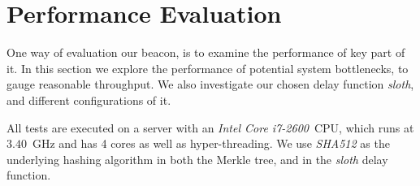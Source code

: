 \section{Performance Evaluation}
One way of evaluation our beacon, is to examine the performance of key part of it.
In this section we explore the performance of potential system bottlenecks, to gauge reasonable throughput.
We also investigate our chosen delay function \textit{sloth}, and different configurations of it.

All tests are executed on a server with an \textit{Intel Core i7-2600}~CPU, which runs at $3.40$~GHz and has 4 cores as well as hyper-threading.
We use \textit{SHA512} as the underlying hashing algorithm in both the Merkle tree, and in the \textit{sloth} delay function.
